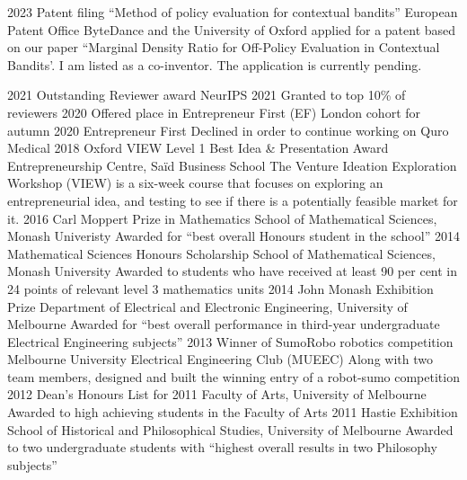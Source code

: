 \documentclass[9pt]{developercv} %
\begin{document}
\begin{entrylist}
  \entry
    {2023}
    {Patent filing ``Method of policy evaluation for contextual bandits''}
    {European Patent Office}
    {ByteDance and the University of Oxford applied for a patent based on our paper ``Marginal Density Ratio for Off-Policy Evaluation in Contextual Bandits'. I am listed as a co-inventor. The application is currently pending.}

  \entry
    {2021}
    {Outstanding Reviewer award}
    {NeurIPS 2021}
    {Granted to top 10\% of reviewers}
  \entry
    {2020}
    {Offered place in Entrepreneur First (EF) London cohort for autumn 2020}
    {Entrepreneur First}
    {Declined in order to continue working on Quro Medical}
  \entry
    {2018}
    {Oxford VIEW Level 1 Best Idea \& Presentation Award}
    {Entrepreneurship Centre, Sa\"id Business School}
    {The Venture Ideation Exploration Workshop (VIEW) is a six-week course that focuses on exploring an entrepreneurial idea, and testing to see if there is a potentially feasible market for it.}
  \entry
    {2016}
    {Carl Moppert Prize in Mathematics}
    {School of Mathematical Sciences, Monash Univeristy}
    {Awarded for ``best overall Honours student in the school''}
  \entry
    {2014}
    {Mathematical Sciences Honours Scholarship}
    {School of Mathematical Sciences, Monash University}
    {Awarded to students who have received at least 90 per cent in 24 points of relevant level 3 mathematics units}
  \entry
    {2014}
    {John Monash Exhibition Prize}
    {Department of Electrical and Electronic Engineering, University of Melbourne}
    {Awarded for ``best overall performance in third-year undergraduate Electrical Engineering subjects''}
  \entry
    {2013}
    {Winner of SumoRobo robotics competition}
    {Melbourne University Electrical Engineering Club (MUEEC)}
    {Along with two team members, designed and built the winning entry of a robot-sumo competition}
  \entry
    {2012}
    {Dean's Honours List for 2011}
    {Faculty of Arts, University of Melbourne}
    {Awarded to high achieving students in the Faculty of Arts}
  \entry
    {2011}
    {Hastie Exhibition}
    {School of Historical and Philosophical Studies, University of Melbourne}
    {Awarded to two undergraduate students with ``highest overall results in two Philosophy subjects''}
\end{entrylist}

\vspace{-1em}

\end{document}

